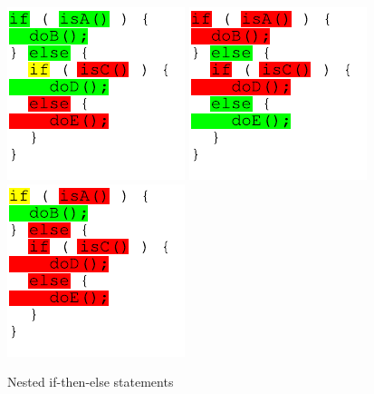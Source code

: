 \begin{figure}[htp]
 \hfill
 \includegraphics[]{images/Source_Code_Highlighting/if/if_with_else_if_green-yellow}
 \hfill
 \includegraphics[]{images/Source_Code_Highlighting/if/if_with_else_if_red-green-red}
 \hfill
 \includegraphics[]{images/Source_Code_Highlighting/if/if_with_else_if_yellow}
 \hfill
 \caption{Nested if-then-else statements}
 \label{ui_fg:Nested if-then-else statements}
\end{figure}
\par

